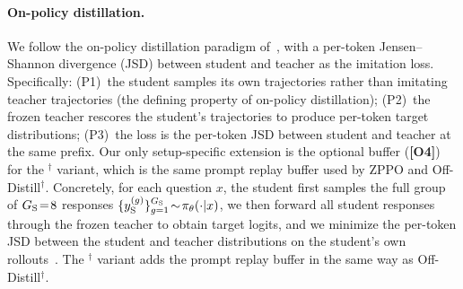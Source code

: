 \paragraph{On-policy distillation.}
We follow the on-policy distillation paradigm of~\citet{agarwal2024policy}, with a per-token Jensen--Shannon divergence (JSD) between student and teacher as the imitation loss. Specifically: (P1)~the student samples its own trajectories rather than imitating teacher trajectories (the defining property of on-policy distillation); (P2)~the frozen teacher rescores the student's trajectories to produce per-token target distributions; (P3)~the loss is the per-token JSD between student and teacher at the same prefix. Our only setup-specific extension is the optional buffer (\textbf{[O4]}) for the $^{\dagger}$ variant, which is the same prompt replay buffer used by ZPPO and Off-Distill$^{\dagger}$. Concretely, for each question $x$, the student first samples the full group of $G_{\rm S}\!=\!8$ responses $\{y_{\rm S}^{(g)}\}_{g=1}^{G_{\rm S}}\!\sim\!\pi_\theta(\cdot|x)$, we then forward all student responses through the frozen teacher to obtain target logits, and we minimize the per-token JSD between the student and teacher distributions on the student's own rollouts~\citep{agarwal2024policy,ko2024distillm}. The $^{\dagger}$ variant adds the prompt replay buffer in the same way as Off-Distill$^{\dagger}$.

